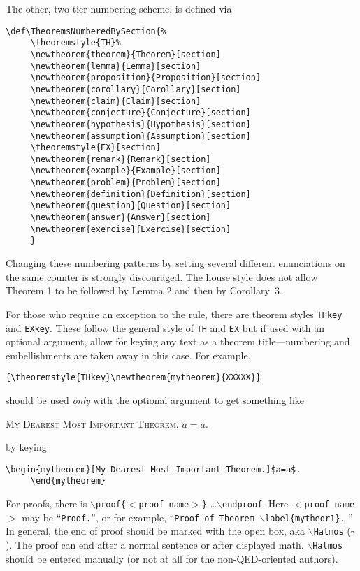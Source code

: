 \documentclass[ijds,nonblindrev]{informs4}
\begin{document}
The other, two-tier numbering scheme, is defined via

\begin{Verbatim}[fontsize=\small]
     \def\TheoremsNumberedBySection{%
     \theoremstyle{TH}%
     \newtheorem{theorem}{Theorem}[section]
     \newtheorem{lemma}{Lemma}[section]
     \newtheorem{proposition}{Proposition}[section]
     \newtheorem{corollary}{Corollary}[section]
     \newtheorem{claim}{Claim}[section]
     \newtheorem{conjecture}{Conjecture}[section]
     \newtheorem{hypothesis}{Hypothesis}[section]
     \newtheorem{assumption}{Assumption}[section]
     \theoremstyle{EX}[section]
     \newtheorem{remark}{Remark}[section]
     \newtheorem{example}{Example}[section]
     \newtheorem{problem}{Problem}[section]
     \newtheorem{definition}{Definition}[section]
     \newtheorem{question}{Question}[section]
     \newtheorem{answer}{Answer}[section]
     \newtheorem{exercise}{Exercise}[section]
     }
\end{Verbatim}

\noindent
Changing these numbering patterns by setting several different enunciations 
on the same counter is strongly discouraged. The house style does not allow 
Theorem 1 to be followed by Lemma 2 and then by Corollary~3.

For those who require an exception to the rule, there are theorem styles 
\texttt{THkey} and \texttt{EXkey}. These follow the general style of 
\texttt{TH} and \texttt{EX} but if used with an optional argument, 
allow for keying any text as a theorem title---numbering and embellishments 
are taken away in this case. For example,

\begin{Verbatim}[fontsize=\small]
     {\theoremstyle{THkey}\newtheorem{mytheorem}{XXXXX}}
\end{Verbatim}

\noindent
should be used {\it only} with the optional argument to get something like 

\textsc{My 
Dearest Most Important Theorem.} $a=a. $

by keying

\begin{Verbatim}[fontsize=\small]
     \begin{mytheorem}[My Dearest Most Important Theorem.]$a=a$.
     \end{mytheorem}
\end{Verbatim}

For proofs, there is \texttt{$\backslash $proof\{$<$proof name$>$\}}
\ldots \texttt{$\backslash $endproof}. Here \texttt{$<$proof name$>$} may be 
``\texttt{Proof.}'', or for example, ``\texttt{Proof of Theorem 
$\backslash $label\{mytheor1\}.} '' In general, the end of proof should 
be marked with the open box, aka \texttt{$\backslash $Halmos}
($\square$). The proof can end after a normal sentence or after
displayed math. \texttt{$\backslash $Halmos} should be entered manually (or not at all for the  
non-QED-oriented authors).
\end{document}
